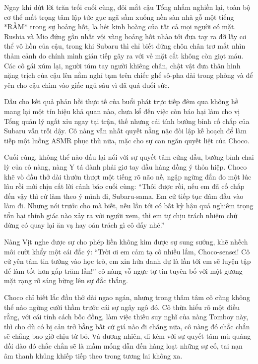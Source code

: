\documentclass[../main.tex]{subfiles}
\begin{document}
Ngay khi dứt lời trăn trối cuối cùng, đôi mắt cậu Tổng nhắm nghiền lại, toàn bộ cơ thể mất trọng tâm lập tức gục ngã sầm xuống nền sàn nhà gỗ một tiếng *RẦM* trong sự hoảng hốt, la hét kinh hoàng của tất cả mọi người có mặt. Rushia và Mio đứng gần nhất vội vàng hoảng hốt nhào tới đưa tay ra đỡ lấy cơ thể vô hồn của cậu, trong khi Subaru thì chỉ biết đứng chôn chân trơ mắt nhìn thảm cảnh do chính mình gián tiếp gây ra với vẻ mặt cắt không còn giọt máu. Các cô gái xúm lại, người túm tay người khiêng chân, chật vật đưa thân hình nặng trịch của cậu lên nằm nghỉ tạm trên chiếc ghế sô-pha dài trong phòng và để yên cho cậu chìm vào giấc ngủ sâu vì đã quá đuối sức.

Dẫu cho kết quả phản hồi thực tế của buổi phát trực tiếp đêm qua không hề mang lại một tín hiệu khả quan nào, chưa kể đến việc còn báo hại làm cho vị Tổng quản lý ngất xỉu ngay tại trận, thế nhưng cái tính bướng bỉnh cố chấp của Subaru vẫn trỗi dậy. Cô nàng vẫn nhất quyết nằng nặc đòi lập kế hoạch để làm tiếp một luồng ASMR phục thù nữa, mặc cho sự can ngăn quyết liệt của Choco.

Cuối cùng, không thể nào đấu lại nổi với sự quyết tâm cứng đầu, bướng bỉnh chai lỳ của cô nàng, nàng Y tá đành phải giơ tay đầu hàng đồng ý thỏa hiệp. Choco khẽ vò đầu thở dài thườn thượt một tiếng rõ não nề, ngập ngừng đắn đo một lúc lâu rồi mới chịu cất lời cảnh báo cuối cùng: ``Thôi được rồi, nếu em đã cố chấp đến vậy thì cứ làm theo ý mình đi, Subaru-sama. Em cứ tiếp tục đâm đầu vào làm đi. Nhưng nói trước cho mà biết, nếu lần tới có bất kỳ hậu quả nghiêm trọng tổn hại thính giác nào xảy ra với người xem, thì em tự chịu trách nhiệm chứ đừng có quay lại ăn vạ hay oán trách gì cô đấy nhé.''

Nàng Vịt nghe được sự cho phép liền không kìm được sự sung sướng, khẽ nhếch môi cười khẩy một cái đắc ý: ``Trời ơi em cảm tạ cô nhiều lắm, Choco-sensei! Cô cứ yên tâm tin tưởng vào học trò, em xin hứa danh dự là lần tới em sẽ luyện tập để làm tốt hơn gấp trăm lần!'' cô nàng vỗ ngực tự tin tuyên bố với một gương mặt rạng rỡ sáng bừng lên sự đắc thắng.

Choco chỉ biết lắc đầu thở dài ngao ngán, nhưng trong thâm tâm cô cũng không thể nào ngừng cười thầm trước cái sự ngây ngô đó. Cô thừa hiểu rõ một điều rằng, với cái tính cách bốc đồng, làm việc thiếu suy nghĩ của nàng Tomboy này, thì cho dù có bị cản trở bằng bất cứ giá nào đi chăng nữa, cô nàng đó chắc chắn sẽ chẳng bao giờ chịu từ bỏ. Và đương nhiên, đi kèm với sự quyết tâm mù quáng dồi dào đó chắc chắn sẽ là mầm mống dẫn đến hàng loạt những sự cố, tai nạn âm thanh khủng khiếp tiếp theo trong tương lai không xa.
\end{document}
